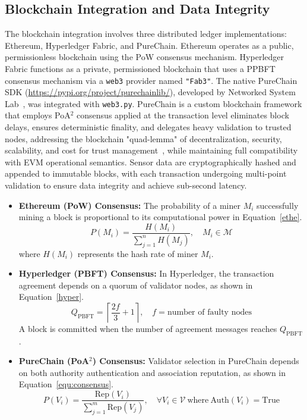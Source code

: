 \documentclass[final,5p,times,twocolumn]{elsarticle}
\begin{document}
\subsection{Blockchain Integration and Data Integrity}
The blockchain integration involves three distributed ledger implementations: Ethereum, Hyperledger Fabric, and PureChain. Ethereum operates as a public, permissionless blockchain using the PoW consensus mechanism. Hyperledger Fabric functions as a private, permissioned blockchain that uses a PPBFT consensus mechanism via a \texttt{web3} provider named \texttt{"Fab3"}. The native PureChain SDK (\url{https://pypi.org/project/purechainlib/}), developed by Networked System Lab~\cite{nslab2023}, was integrated with \texttt{web3.py}. PureChain is a custom blockchain framework that employs PoA$^2$ consensus applied at the transaction level eliminates block delays, ensures deterministic finality, and delegates heavy validation to trusted nodes, addressing
the blockchain "quad-lemma" of decentralization, security,
scalability, and cost for trust management~\cite{ICCE2025, AHAKONYE2025100354, ihmpure}, while maintaining full compatibility with EVM operational semantics. Sensor data are cryptographically hashed and appended to immutable blocks, with each transaction undergoing multi-point validation to ensure data integrity and achieve sub-second latency.

\begin{itemize}
    \item \textbf{Ethereum (PoW) Consensus:}
The probability of a miner \( M_i \) successfully mining a block is proportional to its computational power in Equation~\ref{ethe}.
\begin{equation}
P(M_i) = \frac{H(M_i)}{\sum_{j=1}^{n} H(M_j)}, \quad M_i \in \mathcal{M}\label{ethe}
\end{equation}
where \( H(M_i) \) represents the hash rate of miner \( M_i \).

    \item \textbf{Hyperledger (PBFT) Consensus:}
In Hyperledger, the transaction agreement depends on a quorum of validator nodes, as shown in Equation~\ref{hyper}.
\begin{equation}
Q_{\text{PBFT}} = \left\lceil \frac{2f}{3} + 1 \right\rceil, \quad f = \text{number of faulty nodes}\label{hyper}
\end{equation}
A block is committed when the number of agreement messages reaches \( Q_{\text{PBFT}} \).

    \item \textbf{PureChain (PoA$^2$) Consensus:}
Validator selection in PureChain depends on both authority authentication and association reputation, as shown in Equation~\ref{equ:consensus}.
\begin{equation}
P(V_i) = \frac{\text{Rep}(V_i)}{\sum_{j=1}^{m} \text{Rep}(V_j)}, \quad \forall V_i \in \mathcal{V} \ \text{where} \ \text{Auth}(V_i) = \text{True}\label{equ:consensus}
\end{equation}
\end{itemize}
\end{document}

